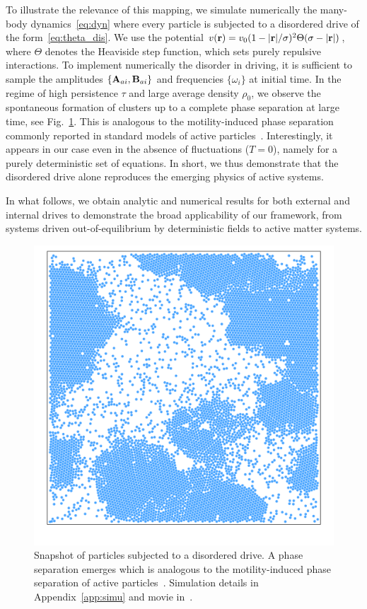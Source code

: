 \documentclass[superscriptaddress, twocolumn, prx, longbibliography, nofootinbib]{revtex4-1}
\begin{document}
To illustrate the relevance of this mapping, we simulate numerically the many-body dynamics~\eqref{eq:dyn} where every particle is subjected to a disordered drive of the form~\eqref{eq:theta_dis}. We use the potential $v({\bf r})=v_0(1-|{\bf r}|/\sigma)^2\Theta(\sigma-|{\bf r}|)$, where $\Theta$ denotes the Heaviside step function, which sets purely repulsive interactions. To implement numerically the disorder in driving, it is sufficient to sample the amplitudes $\{{\bf A}_{ai}, {\bf B}_{ai}\}$ and frequencies $\{\omega_i\}$ at initial time. In the regime of high persistence $\tau$ and large average density $\rho_0$, we observe the spontaneous formation of clusters up to a complete phase separation at large time, see Fig.~\ref{fig0}. This is analogous to the motility-induced phase separation commonly reported in standard models of active particles~\cite{Tailleur2008, Cates2015}. Interestingly, it appears in our case even in the absence of fluctuations ($T=0$), namely for a purely deterministic set of equations. In short, we thus demonstrate that the disordered drive alone reproduces the emerging physics of active systems. 


In what follows, we obtain analytic and numerical results for both external and internal drives to demonstrate the broad applicability of our framework, from systems driven out-of-equilibrium by deterministic fields to active matter systems. 


\begin{figure}
	\centering
	\includegraphics[width=.8\columnwidth]{fig0.pdf}
	\caption{\label{fig0}
		Snapshot of particles subjected to a disordered drive. A phase separation emerges which is analogous to the motility-induced phase separation of active particles~\cite{Tailleur2008, Cates2015}. Simulation details in Appendix~\ref{app:simu} and movie in~\cite{movie}.
	}
\end{figure}
\end{document}
